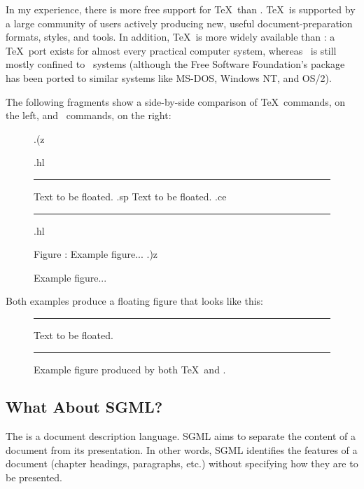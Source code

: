 In my experience, there is more free support for \TeX\ than \troff.
\TeX\ is supported by a large community of users actively producing
new, useful document-preparation formats, styles, and tools.
In addition, \TeX\ is more widely available than \troff:
a \TeX\ port exists for almost every practical computer system, whereas
\troff\ is still mostly confined to \Unix\ systems (although the Free
Software Foundation's  package has been ported to similar
systems like MS-DOS, Windows NT, and OS/2).

The following fragments show a side-by-side comparison of \TeX\
commands, on the left, and \troff\ commands, on the right:

\begin{shortexample}
\begin{figure}                    .(z                    
 \begin{center}                   .hl                    
   \hrule                         Text to be floated.    
   \vspace{8pt}                   .sp                    
   Text to be floated.            .ce                    
   \hrule                         .hl                    
   \caption{Example figure...}    Figure \*[fig]: Example figure...
   \vspace{8pt}                   .)z                    
 \end{center}
\end{figure}
\end{shortexample}

Both examples
produce a floating figure that looks like this:

\begin{figure}
  \begin{center}
    \hrule
    \vspace{8pt}
    Text to be floated.
    \label{fig:texexample}
    \vspace{8pt}
    \hrule
    \caption{Example figure produced by both \TeX\ and .}
  \end{center}
\end{figure}

\subsection{What About SGML?}

The  is a document
description language.  SGML aims to separate the content of a document
from its presentation.  In other words, SGML identifies the features
of a document (chapter headings, paragraphs, etc.) without specifying
how they are to be presented.

